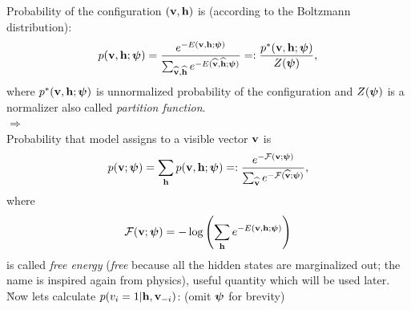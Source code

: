 Probability of the configuration $(\mathbf{v},\mathbf{h})$ is (according to the Boltzmann distribution):
\begin{gather}
p(\mathbf{v},\mathbf{h};\boldsymbol{\psi})=\frac{e^{-E(\mathbf{v},\mathbf{h};\boldsymbol{\psi})}}{\sum_{\mathbf{\widehat{v}},\mathbf{\widehat{h}}} e^{-E(\mathbf{\widehat{v}},\mathbf{\widehat{h}};\boldsymbol{\psi})} }=:\frac{p^*(\mathbf{v},\mathbf{h}; \boldsymbol{\psi})}{Z(\boldsymbol{\psi})},
\end{gather}
where $p^*(\mathbf{v},\mathbf{h}; \boldsymbol{\psi})$ is unnormalized probability of the configuration and $Z(\boldsymbol{\psi})$ is a normalizer also called \emph{partition function}.
\\$\Rightarrow$
\\Probability that model assigns to a visible vector $\mathbf{v}$ is
\begin{gather}
p(\mathbf{v};\boldsymbol{\psi})=\sum_{\mathbf{h}}p(\mathbf{v},\mathbf{h};\boldsymbol{\psi})=:\frac{e^{-\mathcal{F}(\mathbf{v};\boldsymbol{\psi})}}{\sum_{\mathbf{\widehat{v}}} e^{-\mathcal{F}(\mathbf{\widehat{v}};\boldsymbol{\psi})} },
\end{gather}
where
\begin{gather}
\mathcal{F}(\mathbf{v};\boldsymbol{\psi})=-\log\left( \sum_{\mathbf{h}}e^{-E(\mathbf{v},\mathbf{h};\boldsymbol{\psi})} \right)
\end{gather}
is called \emph{free energy} (\emph{free} because all the hidden states are marginalized out; the name is inspired again from physics), useful quantity which will be used later.
\\[1em]
\u{Now lets calculate} $p(v_i=1|\mathbf{h},\mathbf{v}_{-i})$: (omit $\boldsymbol{\psi}$ for brevity)

